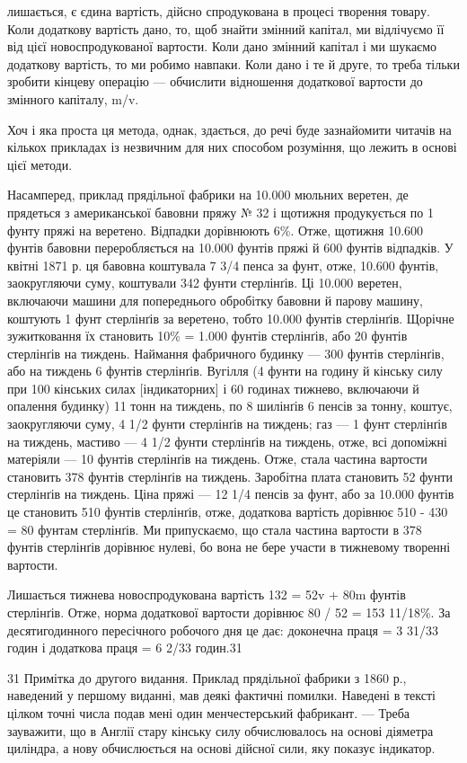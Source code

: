 \parcont{}  %
лишається, є єдина вартість, дійсно спродукована в процесі творення товару. Коли додаткову вартість
дано, то, щоб знайти змінний капітал, ми відлічуємо її від цієї новоспродукованої вартости.
Коли дано змінний капітал і ми шукаємо додаткову вартість, то ми робимо навпаки. Коли дано і те й
друге, то треба тільки зробити кінцеву операцію — обчислити відношення додаткової вартости до
змінного капіталу, m/v.

Хоч і яка проста ця метода, однак, здається, до речі буде зазнайомити читачів на кількох прикладах
із незвичним для них
способом розуміння, що лежить в основі цієї методи.

Насамперед, приклад прядільної фабрики на 10.000 мюльних веретен, де прядеться з американської
бавовни пряжу № 32 і
щотижня продукується по 1 фунту пряжі на веретено. Відпадки дорівнюють 6\%. Отже, щотижня 10.600
фунтів бавовни переробляється на 10.000 фунтів пряжі й 600 фунтів відпадків. У квітні 1871 р. ця
бавовна коштувала 7 3/4 пенса за фунт, отже, 10.600 фунтів, заокругляючи суму, коштували 342 фунти
стерлінґів. Ці 10.000
веретен, включаючи машини для попереднього обробітку бавовни й парову машину, коштують 1 фунт
стерлінґів за веретено, тобто 10.000 фунтів стерлінґів. Щорічне зужитковання їх становить
10\% = 1.000 фунтів стерлінґів, або 20 фунтів стерлінґів на тиждень. Наймання фабричного будинку —
300 фунтів стерлінґів, або на тиждень 6 фунтів стерлінґів. Вугілля (4 фунти на годину
й кінську силу при 100 кінських силах [індикаторних] і 60 годинах тижнево, включаючи й опалення
будинку) 11 тонн
на тиждень, по 8 шилінґів 6 пенсів за тонну, коштує, заокругляючи суму, 4 1/2 фунти стерлінґів на
тиждень; газ — 1 фунт стерлінґів на тиждень, мастиво — 4 1/2 фунти стерлінґів на тиждень, отже, всі
допоміжні матеріяли — 10 фунтів стерлінґів на тиждень. Отже, стала частина вартости становить 378
фунтів стерлінґів
на тиждень. Заробітна плата становить 52 фунти стерлінґів на тиждень. Ціна пряжі — 12 1/4 пенсів за
фунт, або за 10.000 фунтів
це становить 510 фунтів стерлінґів, отже, додаткова вартість дорівнює 510 - 430 = 80 фунтам
стерлінґів. Ми припускаємо, що стала частина вартости в 378 фунтів стерлінґів дорівнює нулеві, бо
вона не бере участи в тижневому творенні вартости.

Лишається тижнева новоспродукована вартість 132 = 52v + 80m фунтів стерлінґів. Отже, норма
додаткової вартости дорівнює
80 / 52 = 153 11/18\%. За десятигодинного пересічного робочого дня це дає: доконечна праця = 3 31/33
годин і додаткова праця = 6 2/33 годин.31

31 Примітка до другого видання. Приклад прядільної фабрики з 1860 р., наведений у першому виданні,
мав деякі фактичні помилки. Наведені в тексті цілком точні числа подав мені один менчестерський
фабрикант. — Треба зауважити, що в Англії стару кінську силу обчислювалось
на основі діяметра циліндра, а нову обчислюється на основі дійсної сили, яку показує індикатор.
